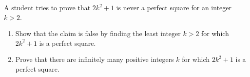 A student tries to prove that $2k^2+1$ is never a perfect square for an integer $k>2$.
\begin{enumerate}
\item[(a)] Show that the claim is false by finding the least integer $k>2$ for which $2k^2+1$ is a perfect square.
\item[(b)] Prove that there are infinitely many positive integers $k$ for which $2k^2+1$ is a perfect square.
\end{enumerate}
